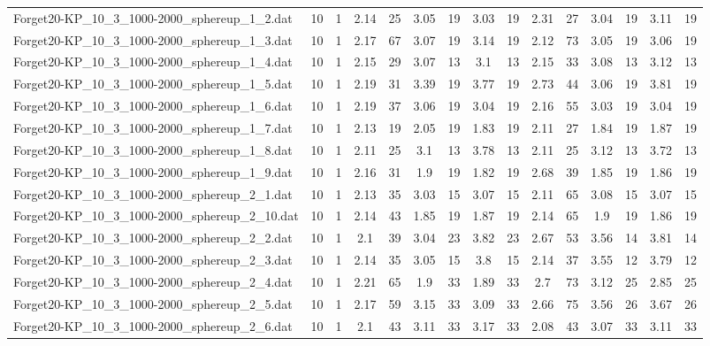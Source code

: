 \begin{table}[!ht]
{\begin{tabular}{lcccccccccccccc}
Forget20-KP\_10\_3\_1000-2000\_sphereup\_1\_2.dat & 10 & 1 & 2.14 & 25 & 3.05 & 19 & 3.03 & 19 & 2.31 & 27 & 3.04 & 19 & 3.11 & 19 \\
Forget20-KP\_10\_3\_1000-2000\_sphereup\_1\_3.dat & 10 & 1 & 2.17 & 67 & 3.07 & 19 & 3.14 & 19 & 2.12 & 73 & 3.05 & 19 & 3.06 & 19 \\
Forget20-KP\_10\_3\_1000-2000\_sphereup\_1\_4.dat & 10 & 1 & 2.15 & 29 & 3.07 & 13 & 3.1 & 13 & 2.15 & 33 & 3.08 & 13 & 3.12 & 13 \\
Forget20-KP\_10\_3\_1000-2000\_sphereup\_1\_5.dat & 10 & 1 & 2.19 & 31 & 3.39 & 19 & 3.77 & 19 & 2.73 & 44 & 3.06 & 19 & 3.81 & 19 \\
Forget20-KP\_10\_3\_1000-2000\_sphereup\_1\_6.dat & 10 & 1 & 2.19 & 37 & 3.06 & 19 & 3.04 & 19 & 2.16 & 55 & 3.03 & 19 & 3.04 & 19 \\
Forget20-KP\_10\_3\_1000-2000\_sphereup\_1\_7.dat & 10 & 1 & 2.13 & 19 & 2.05 & 19 & 1.83 & 19 & 2.11 & 27 & 1.84 & 19 & 1.87 & 19 \\
Forget20-KP\_10\_3\_1000-2000\_sphereup\_1\_8.dat & 10 & 1 & 2.11 & 25 & 3.1 & 13 & 3.78 & 13 & 2.11 & 25 & 3.12 & 13 & 3.72 & 13 \\
Forget20-KP\_10\_3\_1000-2000\_sphereup\_1\_9.dat & 10 & 1 & 2.16 & 31 & 1.9 & 19 & 1.82 & 19 & 2.68 & 39 & 1.85 & 19 & 1.86 & 19 \\
Forget20-KP\_10\_3\_1000-2000\_sphereup\_2\_1.dat & 10 & 1 & 2.13 & 35 & 3.03 & 15 & 3.07 & 15 & 2.11 & 65 & 3.08 & 15 & 3.07 & 15 \\
Forget20-KP\_10\_3\_1000-2000\_sphereup\_2\_10.dat & 10 & 1 & 2.14 & 43 & 1.85 & 19 & 1.87 & 19 & 2.14 & 65 & 1.9 & 19 & 1.86 & 19 \\
Forget20-KP\_10\_3\_1000-2000\_sphereup\_2\_2.dat & 10 & 1 & 2.1 & 39 & 3.04 & 23 & 3.82 & 23 & 2.67 & 53 & 3.56 & 14 & 3.81 & 14 \\
Forget20-KP\_10\_3\_1000-2000\_sphereup\_2\_3.dat & 10 & 1 & 2.14 & 35 & 3.05 & 15 & 3.8 & 15 & 2.14 & 37 & 3.55 & 12 & 3.79 & 12 \\
Forget20-KP\_10\_3\_1000-2000\_sphereup\_2\_4.dat & 10 & 1 & 2.21 & 65 & 1.9 & 33 & 1.89 & 33 & 2.7 & 73 & 3.12 & 25 & 2.85 & 25 \\
Forget20-KP\_10\_3\_1000-2000\_sphereup\_2\_5.dat & 10 & 1 & 2.17 & 59 & 3.15 & 33 & 3.09 & 33 & 2.66 & 75 & 3.56 & 26 & 3.67 & 26 \\
Forget20-KP\_10\_3\_1000-2000\_sphereup\_2\_6.dat & 10 & 1 & 2.1 & 43 & 3.11 & 33 & 3.17 & 33 & 2.08 & 43 & 3.07 & 33 & 3.11 & 33 \\

\end{tabular}}
\end{table}
